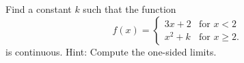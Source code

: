 Find a constant $k$ such that the function 
\[
f(x)= \begin{cases}
  3x+2 & \text{for }   x <2\\
  x^2 +k & \text{for }x \geq 2.
\end{cases}
\]
is continuous.  Hint: Compute the one-sided limits.\answercheck

